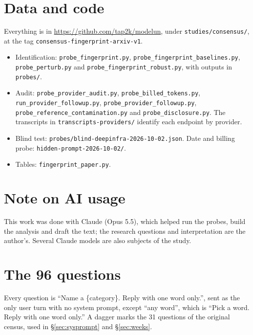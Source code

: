 \documentclass[11pt]{article}
\begin{document}
\section*{Data and code}

Everything is in \url{https://github.com/tap2k/modelun}, under \texttt{studies/consensus/}, at the
tag \texttt{consensus-fingerprint-arxiv-v1}.
\begin{itemize}\setlength{\itemsep}{0pt}\raggedright
\item Identification: \texttt{probe\_fingerprint.py}, \texttt{probe\_fingerprint\_baselines.py},
\texttt{probe\_perturb.py} and \texttt{probe\_fingerprint\_robust.py}, with outputs in
\texttt{probes/}.
\item Audit: \texttt{probe\_provider\_audit.py}, \texttt{probe\_billed\_tokens.py},
\texttt{run\_provider\_followup.py}, \texttt{probe\_provider\_followup.py},
\texttt{probe\_reference\_contamination.py} and \texttt{probe\_disclosure.py}. The transcripts in
\texttt{transcripts-providers/} identify each endpoint by provider.
\item Blind test: \texttt{probes/blind-deepinfra-2026-10-02.json}. Date and billing probe:
\texttt{hidden-prompt-2026-10-02/}.
\item Tables: \texttt{fingerprint\_paper.py}.
\end{itemize}

\section*{Note on AI usage}
This work was done with Claude (Opus 5.5), which helped run the probes, build the analysis and
draft the text; the research questions and interpretation are the author's. Several Claude
models are also subjects of the study.




\appendix

\section{The 96 questions}
\label{app:questions}

Every question is ``Name a \{category\}. Reply with one word only.'', sent as the only user turn
with no system prompt, except ``any word'', which is ``Pick a word. Reply with one word only.''
A dagger marks the 31 questions of the original census, used in \S\ref{sec:sysprompt} and
\S\ref{sec:weeks}.
\end{document}
